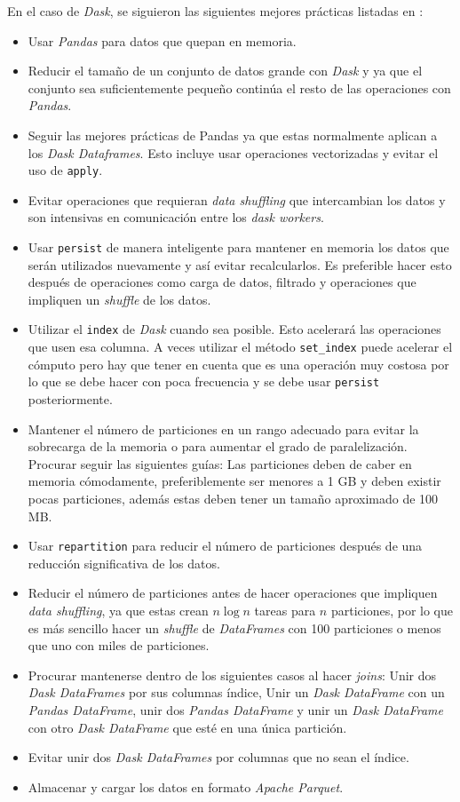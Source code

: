 En el caso de \textit{Dask}, se siguieron las siguientes mejores prácticas listadas en \cite{daskbestpractices}:
\begin{itemize}
	\item Usar \textit{Pandas} para datos que quepan en memoria.
	\item Reducir el tamaño de un conjunto de datos grande con \textit{Dask} y ya que el conjunto sea suficientemente pequeño continúa el resto de las operaciones con \textit{Pandas}.
	\item Seguir las mejores prácticas de Pandas ya que estas normalmente aplican a los \textit{Dask Dataframes}. Esto incluye usar operaciones vectorizadas y evitar el uso de \texttt{apply}.
	\item Evitar operaciones que requieran \textit{data shuffling} que intercambian los datos y son intensivas en comunicación entre los \textit{dask workers}. 
	\item Usar \texttt{persist} de manera inteligente para mantener en memoria los datos que serán utilizados nuevamente y así evitar recalcularlos. Es preferible hacer esto después de operaciones como carga de datos, filtrado y operaciones que impliquen un \textit{shuffle} de los datos.
	\item Utilizar el \texttt{index} de \textit{Dask} cuando sea posible. Esto acelerará las operaciones que usen esa columna. A veces utilizar el método \texttt{set\_index} puede acelerar el cómputo pero hay que tener en cuenta que es una operación muy costosa por lo que se debe hacer con poca frecuencia y se debe usar \texttt{persist} posteriormente.
	\item Mantener el número de particiones en un rango adecuado para evitar la sobrecarga de la memoria o para aumentar el grado de paralelización. Procurar seguir las siguientes guías: Las particiones deben de caber en memoria cómodamente, preferiblemente ser menores a 1 GB y deben existir pocas particiones, además estas deben tener un tamaño aproximado de 100 MB. 
	\item Usar \texttt{repartition} para reducir el número de particiones después de una reducción significativa de los datos.
	\item Reducir el número de particiones antes de hacer operaciones que impliquen \textit{data shuffling}, ya que estas crean $n \log{n}$ tareas para $n$ particiones, por lo que es más sencillo hacer un \textit{shuffle} de \textit{DataFrames} con 100 particiones o menos que uno con miles de particiones.
	\item Procurar mantenerse dentro de los siguientes casos al hacer \textit{joins}: Unir dos \textit{Dask DataFrames} por sus columnas índice, Unir un \textit{Dask DataFrame} con un \textit{Pandas DataFrame}, unir dos \textit{Pandas DataFrame} y unir un \textit{Dask DataFrame} con otro \textit{Dask DataFrame} que esté en una única partición. 
	\item Evitar unir dos \textit{Dask DataFrames} por columnas que no sean el índice.
	\item Almacenar y cargar los datos en formato \textit{Apache Parquet}.
\end{itemize}


